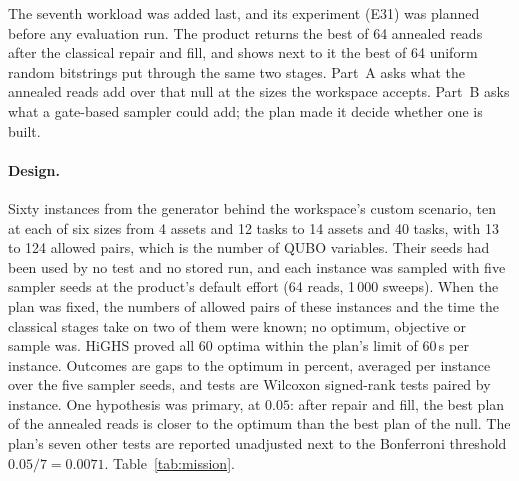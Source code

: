 \documentclass[11pt,a4paper]{article}
\begin{document}
The seventh workload was added last, and its experiment (E31)
was planned before any evaluation run. The product returns the best of 64
annealed reads after the classical repair and fill, and shows next to it the
best of 64 uniform random bitstrings put through the same two stages. Part~A
asks what the annealed reads add over that null at the sizes the workspace
accepts. Part~B asks what a gate-based sampler could add; the plan made it
decide whether one is built.

\paragraph{Design.} Sixty instances from the generator behind the
workspace's custom scenario, ten at each of six sizes from 4 assets and 12
tasks to 14 assets and 40 tasks, with 13 to 124 allowed pairs, which is the
number of QUBO variables. Their seeds had been used by no test and no stored
run, and each instance was sampled with five sampler seeds at the product's
default effort (64 reads, 1\,000 sweeps). When the plan was fixed, the
numbers of allowed pairs of these instances and the time the classical
stages take on two of them were known; no optimum, objective or sample was.
HiGHS proved all 60 optima within the plan's limit of 60\,s per instance.
Outcomes are gaps to the optimum in percent, averaged per instance over the
five sampler seeds, and tests are Wilcoxon signed-rank tests paired by
instance. One hypothesis was primary, at $0.05$: after repair and fill, the
best plan of the annealed reads is closer to the optimum than the best plan
of the null. The plan's seven other tests are reported unadjusted next to
the Bonferroni threshold $0.05/7 = 0.0071$. Table~\ref{tab:mission}.
\end{document}
